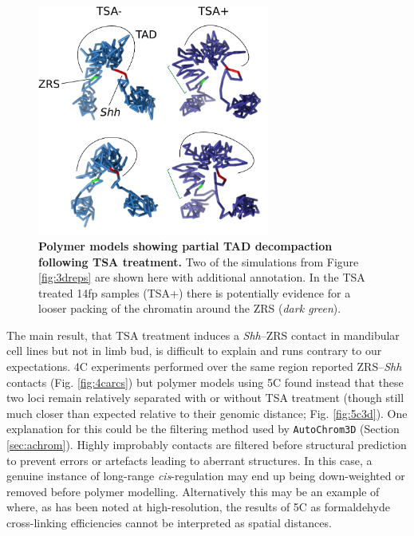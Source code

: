 \documentclass[a4paper,11pt,oneside]{book}
\begin{document}
\begin{figure}
\begin{center} 
\includegraphics[width=3in]{decompaction.pdf}
\captionsetup{width=\textwidth} 
\caption[ Polymer models showing partial TAD decompaction following TSA treatment. ]{ {\bf Polymer models showing partial TAD decompaction following TSA treatment. }
Two of the simulations from Figure \ref{fig:3dreps} are shown here with additional annotation. In the TSA treated 14fp samples (TSA+) there is potentially evidence for a looser packing of the chromatin around the ZRS (\emph{dark green}).
}\label{fig:decompaction}
\end{center} 
\end{figure} 


The main result, that TSA treatment induces a \emph{Shh}--ZRS contact in mandibular cell lines but not in limb bud, is difficult to explain and runs contrary to our expectations. 4C experiments performed over the same region reported ZRS--\emph{Shh} contacts (Fig. \ref{fig:4carcs}) but polymer models using 5C found instead that these two loci remain relatively separated with or without TSA treatment (though still much closer than expected relative to their genomic distance; Fig. \ref{fig:5c3d}). One explanation for this could be the filtering method used by \texttt{AutoChrom3D} (Section \ref{sec:achrom}). Highly improbably contacts are filtered before structural prediction to prevent errors or artefacts leading to aberrant structures. In this case, a genuine instance of long-range \emph{cis}-regulation may end up being down-weighted or removed before polymer modelling. Alternatively this may be an example of where, as has been noted at high-resolution, the results of 5C as formaldehyde cross-linking efficiencies cannot be interpreted as spatial distances.\cite{Williamson2014}
\end{document}
